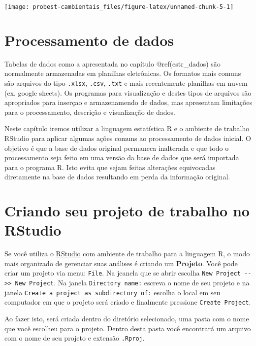 \documentclass[
]{book}
\begin{document}
\begin{center}\texttt{[image: probest-cambientais\_files/figure-latex/unnamed-chunk-5-1]} \end{center}

\hypertarget{proc_dados}{%
\chapter{Processamento de dados}\label{proc_dados}}

Tabelas de dados como a apresentada no capítulo @ref(estr\_dados) são normalmente armazenadas em planilhas eletrônicas. Os formatos mais comuns são arquivos do tipo \texttt{.xlsx}, \texttt{.csv}, \texttt{.txt} e mais recentemente planilhas em nuvem (ex. google sheets). Os programas para visualização e destes tipos de arquivos são apropriados para inserçao e armazenamendo de dados, mas apresentam limitações para o processamento, descrição e visualização de dados.

Neste capítulo iremos utilizar a linguagem estatística R e o ambiente de trabalho RStudio para aplicar algumas ações comuns ao processamento de dados inicial. O objetivo é que a base de dados original permaneca inalterada e que todo o processamento seja feito em uma versão da base de dados que será importada para o programa R. Isto evita que sejam feitas alterações equivocadas diretamente na base de dados resultando em perda da informação original.

\hypertarget{criando-seu-projeto-de-trabalho-no-rstudio}{%
\chapter{Criando seu projeto de trabalho no RStudio}\label{criando-seu-projeto-de-trabalho-no-rstudio}}

Se você utiliza o \href{https://rstudio.com/}{RStudio} com ambiente de trabalho para a linguagem R, o modo mais organizado de gerenciar suas análises é criando um \textbf{Projeto}. Você pode criar um projeto via menu: \texttt{File}. Na jeanela que se abrir escolha \texttt{New\ Project\ -\/-\textgreater{}\textgreater{}\ New\ Project}. Na janela \texttt{Directory\ name:} escreva o nome de seu projeto e na janela \texttt{Create\ a\ project\ as\ subdirectory\ of:} escolha o local em seu computador em que o projeto será criado e finalmente pressione \texttt{Create\ Project}.

Ao fazer isto, será criada dentro do diretório selecionado, uma pasta com o nome que você escolheu para o projeto. Dentro desta pasta você encontrará um arquivo com o nome de seu projeto e extensão \texttt{.Rproj}.
\end{document}

